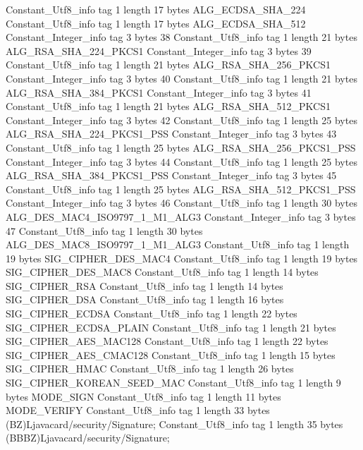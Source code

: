 {{{		}
		Constant_Utf8_info {
			tag	1
			length	17
			bytes	ALG_ECDSA_SHA_224
		}
		Constant_Utf8_info {
			tag	1
			length	17
			bytes	ALG_ECDSA_SHA_512
		}
		Constant_Integer_info {
			tag	3
			bytes	38
		}
		Constant_Utf8_info {
			tag	1
			length	21
			bytes	ALG_RSA_SHA_224_PKCS1
		}
		Constant_Integer_info {
			tag	3
			bytes	39
		}
		Constant_Utf8_info {
			tag	1
			length	21
			bytes	ALG_RSA_SHA_256_PKCS1
		}
		Constant_Integer_info {
			tag	3
			bytes	40
		}
		Constant_Utf8_info {
			tag	1
			length	21
			bytes	ALG_RSA_SHA_384_PKCS1
		}
		Constant_Integer_info {
			tag	3
			bytes	41
		}
		Constant_Utf8_info {
			tag	1
			length	21
			bytes	ALG_RSA_SHA_512_PKCS1
		}
		Constant_Integer_info {
			tag	3
			bytes	42
		}
		Constant_Utf8_info {
			tag	1
			length	25
			bytes	ALG_RSA_SHA_224_PKCS1_PSS
		}
		Constant_Integer_info {
			tag	3
			bytes	43
		}
		Constant_Utf8_info {
			tag	1
			length	25
			bytes	ALG_RSA_SHA_256_PKCS1_PSS
		}
		Constant_Integer_info {
			tag	3
			bytes	44
		}
		Constant_Utf8_info {
			tag	1
			length	25
			bytes	ALG_RSA_SHA_384_PKCS1_PSS
		}
		Constant_Integer_info {
			tag	3
			bytes	45
		}
		Constant_Utf8_info {
			tag	1
			length	25
			bytes	ALG_RSA_SHA_512_PKCS1_PSS
		}
		Constant_Integer_info {
			tag	3
			bytes	46
		}
		Constant_Utf8_info {
			tag	1
			length	30
			bytes	ALG_DES_MAC4_ISO9797_1_M1_ALG3
		}
		Constant_Integer_info {
			tag	3
			bytes	47
		}
		Constant_Utf8_info {
			tag	1
			length	30
			bytes	ALG_DES_MAC8_ISO9797_1_M1_ALG3
		}
		Constant_Utf8_info {
			tag	1
			length	19
			bytes	SIG_CIPHER_DES_MAC4
		}
		Constant_Utf8_info {
			tag	1
			length	19
			bytes	SIG_CIPHER_DES_MAC8
		}
		Constant_Utf8_info {
			tag	1
			length	14
			bytes	SIG_CIPHER_RSA
		}
		Constant_Utf8_info {
			tag	1
			length	14
			bytes	SIG_CIPHER_DSA
		}
		Constant_Utf8_info {
			tag	1
			length	16
			bytes	SIG_CIPHER_ECDSA
		}
		Constant_Utf8_info {
			tag	1
			length	22
			bytes	SIG_CIPHER_ECDSA_PLAIN
		}
		Constant_Utf8_info {
			tag	1
			length	21
			bytes	SIG_CIPHER_AES_MAC128
		}
		Constant_Utf8_info {
			tag	1
			length	22
			bytes	SIG_CIPHER_AES_CMAC128
		}
		Constant_Utf8_info {
			tag	1
			length	15
			bytes	SIG_CIPHER_HMAC
		}
		Constant_Utf8_info {
			tag	1
			length	26
			bytes	SIG_CIPHER_KOREAN_SEED_MAC
		}
		Constant_Utf8_info {
			tag	1
			length	9
			bytes	MODE_SIGN
		}
		Constant_Utf8_info {
			tag	1
			length	11
			bytes	MODE_VERIFY
		}
		Constant_Utf8_info {
			tag	1
			length	33
			bytes	(BZ)Ljavacard/security/Signature;
		}
		Constant_Utf8_info {
			tag	1
			length	35
			bytes	(BBBZ)Ljavacard/security/Signature;
		}
}}
